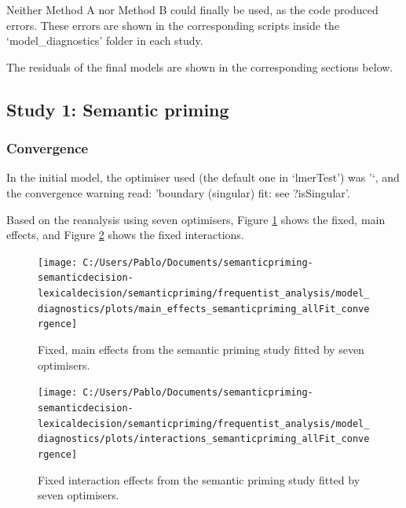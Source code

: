 \documentclass[
  12pt,
  man,floatsintext]{apa7}
\begin{document}
Neither Method A nor Method B could finally be used, as the code produced errors. These errors are shown in the corresponding scripts inside the `model\_diagnostics' folder in each study.

The residuals of the final models are shown in the corresponding sections below.

\hypertarget{study-1-semantic-priming-2}{%
\subsection{Study 1: Semantic priming}\label{study-1-semantic-priming-2}}

\hypertarget{convergence-2}{%
\subsubsection{Convergence}\label{convergence-2}}

In the initial model, the optimiser used (the default one in `lmerTest') was '`, and the convergence warning read: 'boundary (singular) fit: see ?isSingular'.

Based on the reanalysis using seven optimisers, Figure \ref{fig:main-effects-semanticpriming-allFit-convergence} shows the fixed, main effects, and Figure \ref{fig:interactions-semanticpriming-allFit-convergence} shows the fixed interactions.

\begin{figure}

{\centering \texttt{[image: C:/Users/Pablo/Documents/semanticpriming-semanticdecision-lexicaldecision/semanticpriming/frequentist\_analysis/model\_diagnostics/plots/main\_effects\_semanticpriming\_allFit\_convergence]} 

}

\caption{Fixed, main effects from the semantic priming study fitted by seven optimisers.}\label{fig:main-effects-semanticpriming-allFit-convergence}
\end{figure}

\begin{figure}

{\centering \texttt{[image: C:/Users/Pablo/Documents/semanticpriming-semanticdecision-lexicaldecision/semanticpriming/frequentist\_analysis/model\_diagnostics/plots/interactions\_semanticpriming\_allFit\_convergence]} 

}

\caption{Fixed interaction effects from the semantic priming study fitted by seven optimisers.}\label{fig:interactions-semanticpriming-allFit-convergence}
\end{figure}
\end{document}

